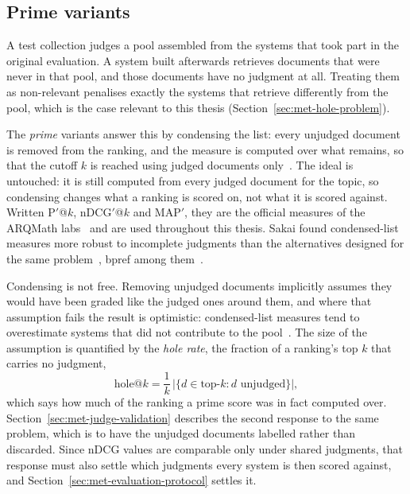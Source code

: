 \subsection*{Prime variants}

A test collection judges a pool assembled from the systems that took part in the
original evaluation. A system built afterwards retrieves documents that were never
in that pool, and those documents have no judgment at all. Treating them as
non-relevant penalises exactly the systems that retrieve differently from the pool,
which is the case relevant to this thesis (Section~\ref{sec:met-hole-problem}).

The \emph{prime} variants answer this by condensing the list: every unjudged
document is removed from the ranking, and the measure is computed over what
remains, so that the cutoff $k$ is reached using judged documents
only~\cite{sakai2008prime}. The ideal is untouched: it is still computed from every
judged document for the topic, so condensing changes what a ranking is scored on,
not what it is scored against. Written P$'$@$k$, nDCG$'$@$k$ and MAP$'$, they are the
official measures of the ARQMath labs~\cite{mansouri2022arqmath3} and are used
throughout this thesis. Sakai found condensed-list measures more robust to
incomplete judgments than the alternatives designed for the same
problem~\cite{sakai2007alternatives}, bpref among them~\cite{buckley2004incomplete}.

Condensing is not free. Removing unjudged documents implicitly assumes they would
have been graded like the judged ones around them, and where that assumption fails
the result is optimistic: condensed-list measures tend to overestimate systems that
did not contribute to the pool~\cite{froebe2023bootstrapped}. The size of the
assumption is quantified by the \emph{hole rate}, the fraction of a ranking's top
$k$ that carries no judgment,
\begin{equation}
\mathrm{hole}@k = \frac{1}{k}\,\bigl|\{d \in \text{top-}k : d \text{ unjudged}\}\bigr| ,
\end{equation}
which says how much of the ranking a prime score was in fact computed over.
Section~\ref{sec:met-judge-validation} describes the second response to the same
problem, which is to have the unjudged documents labelled rather than discarded.
Since nDCG values are comparable only under shared judgments, that response must also
settle which judgments every system is then scored against, and
Section~\ref{sec:met-evaluation-protocol} settles it.

